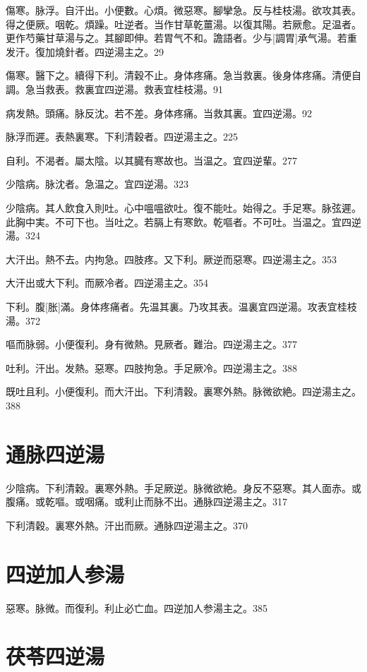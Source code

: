 \documentclass[12pt,twoside,UTF8,b5paper]{ctexbook}
\begin{document}
傷寒。脉浮。自汗出。小便數。心煩。微惡寒。腳攣急。反与桂枝湯。欲攻其表。得之便厥。咽乾。煩躁。吐逆者。当作甘草乾薑湯。以復其陽。若厥愈。足温者。更作芍藥甘草湯与之。其腳即伸。若胃气不和。譫語者。少与[調胃]承气湯。若重发汗。復加燒針者。四逆湯主之。29

傷寒。醫下之。續得下利。清穀不止。身体疼痛。急当救裏。後身体疼痛。清便自調。急当救表。救裏宜四逆湯。救表宜桂枝湯。91

病发熱。頭痛。脉反沈。若不差。身体疼痛。当救其裏。宜四逆湯。92

脉浮而遲。表熱裏寒。下利清穀者。四逆湯主之。225

自利。不渴者。屬太陰。以其臓有寒故也。当温之。宜四逆輩。277

少陰病。脉沈者。急温之。宜四逆湯。323

少陰病。其人飲食入則吐。心中嗢嗢欲吐。復不能吐。始得之。手足寒。脉弦遲。此胸中実。不可下也。当吐之。若膈上有寒飲。乾嘔者。不可吐。当温之。宜四逆湯。324

大汗出。熱不去。内拘急。四肢疼。又下利。厥逆而惡寒。四逆湯主之。353

大汗出或大下利。而厥冷者。四逆湯主之。354

下利。腹[胀]滿。身体疼痛者。先温其裏。乃攻其表。温裏宜四逆湯。攻表宜桂枝湯。372

嘔而脉弱。小便復利。身有微熱。見厥者。難治。四逆湯主之。377

吐利。汗出。发熱。惡寒。四肢拘急。手足厥冷。四逆湯主之。388

既吐且利。小便復利。而大汗出。下利清穀。裏寒外熱。脉微欲絶。四逆湯主之。388

\section{通脉四逆湯}

少陰病。下利清穀。裏寒外熱。手足厥逆。脉微欲絶。身反不惡寒。其人面赤。或腹痛。或乾嘔。或咽痛。或利止而脉不出。通脉四逆湯主之。317

下利清穀。裏寒外熱。汗出而厥。通脉四逆湯主之。370

\section{四逆加人参湯}

惡寒。脉微。而復利。利止必亡血。四逆加人参湯主之。385

\section{茯苓四逆湯}
\end{document}
